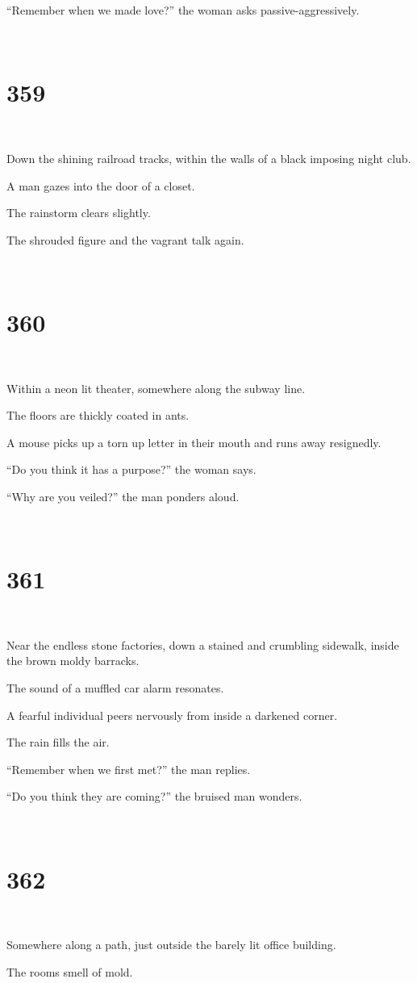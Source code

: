 \documentclass{report}
\begin{document}
``Remember when we made love?'' the woman asks passive-aggressively.

~
\chapter*{359}
~

Down the shining railroad tracks, within the walls of a black imposing night club.

A man gazes into the door of a closet.

The rainstorm clears slightly.

The shrouded figure and the vagrant talk again.

~
\chapter*{360}
~

Within a neon lit theater, somewhere along the subway line.

The floors are thickly coated in ants.

A mouse picks up a torn up letter in their mouth and runs away resignedly.

``Do you think it has a purpose?'' the woman says.

``Why are you veiled?'' the man ponders aloud.

~
\chapter*{361}
~

Near the endless stone factories, down a stained and crumbling sidewalk, inside the brown moldy barracks.

The sound of a muffled car alarm resonates.

A fearful individual peers nervously from inside a darkened corner.

The rain fills the air.

``Remember when we first met?'' the man replies.

``Do you think they are coming?'' the bruised man wonders.

~
\chapter*{362}
~

Somewhere along a path, just outside the barely lit office building.

The rooms smell of mold.
\end{document}
